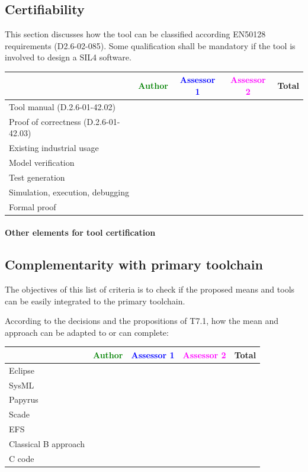 \subsection{Certifiability}

This section discusses how the tool can be classified according EN50128 requirements (D2.6-02-085). Some qualification shall be mandatory  if the tool is involved to design a SIL4 software.


\begin{tabular}{|l | c | c | c | c|}
\hline
& \textcolor{green}{Author} & \textcolor{blue}{Assessor 1} & \textcolor{magenta}{Assessor 2} & Total \\
\hline 
Tool manual (D.2.6-01-42.02) & & & &  \\
\hline
Proof of correctness (D.2.6-01-42.03)   & & & & \\
\hline
Existing industrial  usage  & & & & \\
\hline
Model verification & & & & \\
\hline
Test generation & & & & \\
\hline
Simulation, execution, debugging & & & & \\
\hline
Formal proof & & & & \\
\hline
\end{tabular}

\paragraph{Other elements for tool certification}


\subsection{Complementarity with primary toolchain}

The objectives of this list of criteria is to check if the proposed means and tools can be easily integrated to the primary toolchain.


According to the decisions and the propositions of T7.1, how the mean and approach can be adapted to or can complete:

\begin{tabular}{|l | c | c | c | c|}
\hline
& \textcolor{green}{Author} & \textcolor{blue}{Assessor 1} & \textcolor{magenta}{Assessor 2} & Total \\
\hline 
Eclipse & & & &  \\
\hline
SysML  & & & & \\
\hline
Papyrus  & & & & \\
\hline
Scade & & & & \\
\hline
EFS & & & & \\
\hline
Classical B approach & & & & \\
\hline
C code & & & & \\
\hline
\end{tabular}


